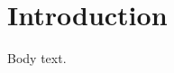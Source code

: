 \documentclass[english]{gretsi}
\affil{1}{Technology Innovation Institute, Abu Dhabi}
\affil{2}{Inria, Villeurbanne}
\begin{document}
\maketitle
\section{Introduction}
Body text.
\end{document}
